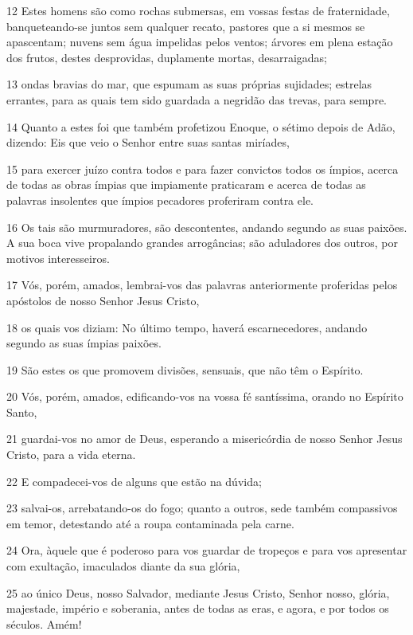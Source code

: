 \par 12 Estes homens são como rochas submersas, em vossas festas de fraternidade, banqueteando-se juntos sem qualquer recato, pastores que a si mesmos se apascentam; nuvens sem água impelidas pelos ventos; árvores em plena estação dos frutos, destes desprovidas, duplamente mortas, desarraigadas;
\par 13 ondas bravias do mar, que espumam as suas próprias sujidades; estrelas errantes, para as quais tem sido guardada a negridão das trevas, para sempre.
\par 14 Quanto a estes foi que também profetizou Enoque, o sétimo depois de Adão, dizendo: Eis que veio o Senhor entre suas santas miríades,
\par 15 para exercer juízo contra todos e para fazer convictos todos os ímpios, acerca de todas as obras ímpias que impiamente praticaram e acerca de todas as palavras insolentes que ímpios pecadores proferiram contra ele.
\par 16 Os tais são murmuradores, são descontentes, andando segundo as suas paixões. A sua boca vive propalando grandes arrogâncias; são aduladores dos outros, por motivos interesseiros.
\par 17 Vós, porém, amados, lembrai-vos das palavras anteriormente proferidas pelos apóstolos de nosso Senhor Jesus Cristo,
\par 18 os quais vos diziam: No último tempo, haverá escarnecedores, andando segundo as suas ímpias paixões.
\par 19 São estes os que promovem divisões, sensuais, que não têm o Espírito.
\par 20 Vós, porém, amados, edificando-vos na vossa fé santíssima, orando no Espírito Santo,
\par 21 guardai-vos no amor de Deus, esperando a misericórdia de nosso Senhor Jesus Cristo, para a vida eterna.
\par 22 E compadecei-vos de alguns que estão na dúvida;
\par 23 salvai-os, arrebatando-os do fogo; quanto a outros, sede também compassivos em temor, detestando até a roupa contaminada pela carne.
\par 24 Ora, àquele que é poderoso para vos guardar de tropeços e para vos apresentar com exultação, imaculados diante da sua glória,
\par 25 ao único Deus, nosso Salvador, mediante Jesus Cristo, Senhor nosso, glória, majestade, império e soberania, antes de todas as eras, e agora, e por todos os séculos. Amém!


